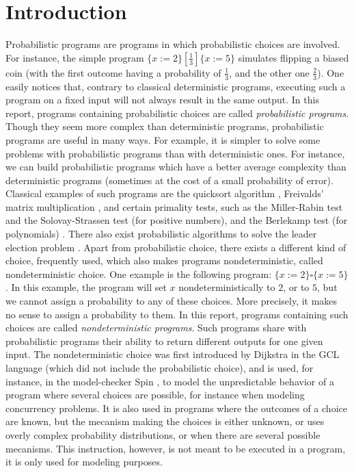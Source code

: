 \documentclass[a4paper,10pt]{llncs}
\begin{document}
\section{Introduction}
\label{sec:intro}
Probabilistic programs are programs in which probabilistic choices are involved. For instance, the simple program $\{ x := 2 \} [\frac{1}{3}] \{ x := 5 \}$ simulates flipping a biased coin (with the first outcome having a probability of $\frac{1}{3}$, and the other one $\frac{2}{3}$). One easily notices that, contrary to classical deterministic programs, executing such a program on a fixed input will not always result in the same output. In this report, programs containing probabilistic choices are called \emph{probabilistic programs}. Though they seem more complex than deterministic programs, probabilistic programs are useful in many ways. For example, it is simpler to solve some problems with probabilistic programs than with deterministic ones. For instance, we can build probabilistic programs which have a better average complexity than deterministic programs (sometimes at the cost of a small probability of error). Classical examples of such programs are the quicksort algorithm \cite{Hoare61}, Freivalds' matrix multiplication \cite{Freivalds77}, and certain primality tests, such as the Miller-Rabin test \cite{Rabin77} and the Solovay-Strassen test \cite{SolovayStrassen77} (for positive numbers), and the Berlekamp test (for polynomials) \cite{Berlekamp67}. There also exist probabilistic algorithms to solve the leader election problem \cite{Ramanathan04}.\newline 
Apart from probabilistic choice, there exists a different kind of choice, frequently used, which also makes programs nondeterministic, called nondeterministic choice. One example is the following program: $\{ x := 2 \} \square \{ x := 5 \}$. In this example, the program will set $x$ nondeterministically to $2$, or to $5$, but we cannot assign a probability to any of these choices. More precisely, it makes no sense to assign a probability to them. In this report, programs containing such choices are called \emph{nondeterministic programs}. Such programs share with probabilistic programs their ability to return different outputs for one given input. The nondeterministic choice was first introduced by Dijkstra in the GCL language \cite{Dijkstra76} (which did not include the probabilistic choice), and is used, for instance, in the model-checker Spin \cite{Holzmann97}, to model the unpredictable behavior of a program where several choices are possible, for instance when modeling concurrency problems. It is also used in programs where the outcomes of a choice are known, but the mecanism making the choices is either unknown, or uses overly complex probability distributions, or when there are several possible mecanisms. \cite{McIver05} This instruction, however, is not meant to be executed in a program, it is only used for modeling purposes.\bigskip
\end{document}
